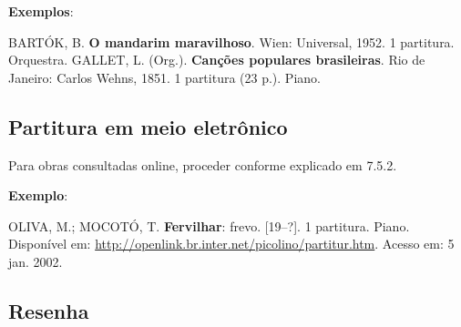 \begin{exemplomanual}
\textbf{Exemplos}:\\
\begin{singlespace}
BARTÓK, B. \textbf{O mandarim maravilhoso}. Wien: Universal, 1952. 1 partitura. Orquestra.
\newline
\newline
GALLET, L. (Org.). \textbf{Canções populares brasileiras}. Rio de Janeiro: Carlos Wehns, 1851. 1 partitura (23 p.). Piano.
\end{singlespace}
\end{exemplomanual}


\subsection{Partitura em meio eletrônico}

\begin{flushleft}
\end{flushleft}

Para obras consultadas online, proceder conforme explicado em 7.5.2.

\begin{exemplomanual}
\textbf{Exemplo}:\\
\begin{singlespace}
OLIVA, M.; MOCOTÓ, T. \textbf{Fervilhar}: frevo. [19--?]. 1 partitura. Piano. Disponível em: \url{http://openlink.br.inter.net/picolino/partitur.htm}. Acesso em: 5 jan. 2002.
\end{singlespace}
\end{exemplomanual}


\subsection{Resenha}

\begin{flushleft}
\begin{singlespace}
\end{singlespace}
\end{flushleft}

